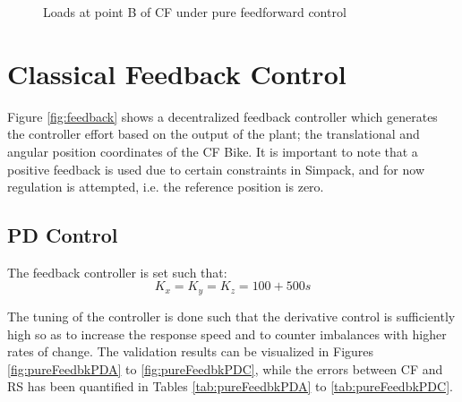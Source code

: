 \begin{figure}[h!]
     \centering
     \scalebox{1.0}{
     \begin{tikzpicture}
        
    \end{tikzpicture}}
    \caption{Loads at point B of CF under pure feedforward control}
    \label{fig:pureFeedFwdB}
\end{figure}



\section{Classical Feedback Control}
\label{sec:chap3sec3}
Figure \ref{fig:feedback} shows a decentralized feedback controller which generates the controller effort based on the output of the plant; the translational and angular position coordinates of the CF Bike. It is important to note that a positive feedback is used due to certain constraints in Simpack, and for now regulation is attempted, i.e. the reference position is zero. 

\subsection*{PD Control}
The feedback controller is set such that:
$$K_x = K_y = K_z = 100 + 500s$$

The tuning of the controller is done such that the derivative control is sufficiently high so as to increase the response speed and to counter imbalances with higher rates of change. The validation results can be visualized in Figures \ref{fig:pureFeedbkPDA} to \ref{fig:pureFeedbkPDC}, while the errors between CF and RS has been quantified in Tables \ref{tab:pureFeedbkPDA} to \ref{tab:pureFeedbkPDC}. 

